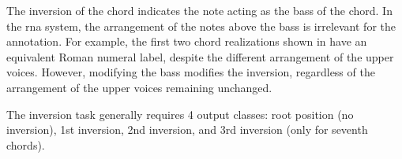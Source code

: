 
The inversion of the chord indicates the note acting as the
bass of the chord. In the \gls{rna} system, the arrangement
of the notes above the bass is irrelevant for the
annotation. For example, the first two chord realizations
shown in  have an equivalent Roman numeral
label, despite the different arrangement of the upper
voices. However, modifying the bass modifies the inversion,
regardless of the arrangement of the upper voices remaining
unchanged.


 The inversion task generally requires 4 output classes:
 root position (no inversion), 1st inversion, 2nd inversion,
 and 3rd inversion (only for seventh chords).
